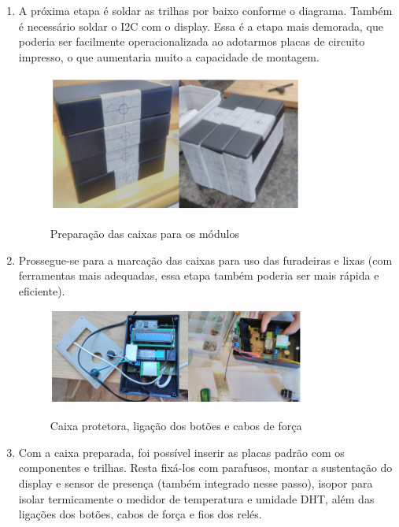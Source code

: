\begin{enumerate}
	\item A próxima etapa é soldar as trilhas por baixo conforme o diagrama. Também é necessário soldar o I2C com o display. Essa é a etapa mais demorada, que poderia ser facilmente operacionalizada ao adotarmos placas de circuito impresso, o que aumentaria muito a capacidade de montagem.

	\begin{figure}[H]
		\centering
		\caption{Preparação das caixas para os módulos}
		\includegraphics[width=0.8\textwidth]{PrepCaixasModulos}
		\label{fig:PrepCaixasModulos}
	\end{figure}

	\item Prossegue-se para a marcação das caixas para uso das furadeiras e lixas (com ferramentas mais adequadas, essa etapa também poderia ser mais rápida e eficiente).

	\begin{figure}[H]
		\centering
		\caption{Caixa protetora, ligação dos botões e cabos de força}
		\includegraphics[width=0.8\textwidth]{BotoesCabosForca}
		\label{fig:BotoesCabosForca}
	\end{figure}

	\item Com a caixa preparada, foi possível inserir as placas padrão com os componentes e trilhas. Resta fixá-los com parafusos, montar a sustentação do display e sensor de presença (também integrado nesse passo), isopor para isolar termicamente o medidor de temperatura e umidade DHT, além das ligações dos botões, cabos de força e fios dos relés.


\end{enumerate}
